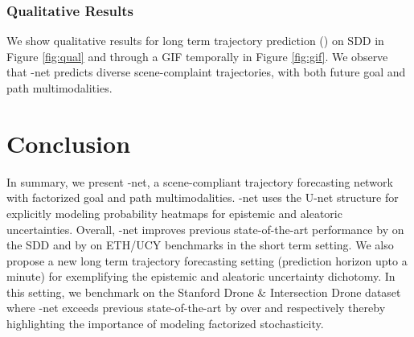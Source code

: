 \documentclass[final]{cvpr}
\begin{document}
\subsubsection{Qualitative Results}
We show qualitative results for long term trajectory prediction () on SDD in Figure \ref{fig:qual} and through a GIF temporally in Figure \ref{fig:gif}. We observe that -net predicts diverse scene-complaint trajectories, with both future goal and path multimodalities.

\section{Conclusion}
In summary, we present -net, a scene-compliant trajectory forecasting network with factorized goal and path multimodalities. -net uses the U-net structure \cite{unet} for explicitly modeling probability heatmaps for epistemic and aleatoric uncertainties. Overall, -net improves previous state-of-the-art performance by  on the SDD and by  on ETH/UCY benchmarks in the short term setting. We also propose a new long term trajectory forecasting setting (prediction horizon upto a minute) for exemplifying the epistemic and aleatoric uncertainty dichotomy. In this setting, we benchmark on the Stanford Drone \& Intersection Drone dataset where -net exceeds previous state-of-the-art by over  and  respectively thereby highlighting the importance of modeling factorized stochasticity.

{\small


}
\end{document}
